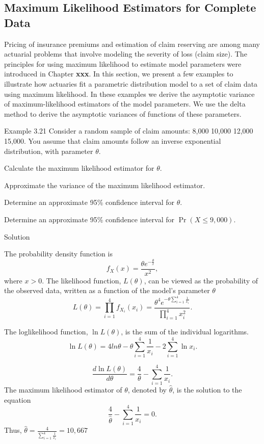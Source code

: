 \documentclass[]{book}
\theoremstyle{definition}
\theoremstyle{definition}
\theoremstyle{definition}
\theoremstyle{remark}
\begin{document}
\subsection{Maximum Likelihood Estimators for Complete
Data}\label{maximum-likelihood-estimators-for-complete-data}

Pricing of insurance premiums and estimation of claim reserving are
among many actuarial problems that involve modeling the severity of loss
(claim size). The principles for using maximum likelihood to estimate
model parameters were introduced in Chapter \textbf{xxx}. In this
section, we present a few examples to illustrate how actuaries fit a
parametric distribution model to a set of claim data using maximum
likelihood. In these examples we derive the asymptotic variance of
maximum-likelihood estimators of the model parameters. We use the delta
method to derive the asymptotic variances of functions of these
parameters.

Example 3.21 Consider a random sample of claim amounts: 8,000 10,000
12,000 15,000. You assume that claim amounts follow an inverse
exponential distribution, with parameter \(\theta\).

Calculate the maximum likelihood estimator for \(\theta\).

Approximate the variance of the maximum likelihood estimator.

Determine an approximate 95\% confidence interval for \(\theta\).

Determine an approximate 95\% confidence interval for
\(\Pr \left( X \leq 9,000 \right).\)

Solution

The probability density function is
\[f_{X}\left( x \right) = \frac{\theta e^{- \frac{\theta}{x}}}{x^{2}}, \]
where \(x > 0\). The likelihood function, \(L\left( \theta \right)\),
can be viewed as the probability of the observed data, written as a
function of the model's parameter \(\theta\)
\[L\left( \theta \right) = \prod_{i = 1}^{4}{f_{X_{i}}\left( x_{i} \right)} = \frac{\theta^{4}e^{- \theta\sum_{i = 1}^{4}\frac{1}{x_{i}}}}{\prod_{i = 1}^{4}x_{i}^{2}}.\]

The loglikelihood function, \(\ln L \left( \theta \right)\), is the sum
of the individual logarithms.
\[\ln L \left( \theta \right) = 4ln\theta - \theta\sum_{i = 1}^{4}\frac{1}{x_{i}} - 2\sum_{i = 1}^{4}\ln x_{i} .\]

\[\frac{d \ln L \left( \theta \right)}{d \theta} = \frac{4}{\theta} - \sum_{i = 1}^{4}\frac{1}{x_{i}}.\]
The maximum likelihood estimator of \(\theta\), denoted by
\(\hat{\theta}\), is the solution to the equation
\[\frac{4}{\hat{\theta}} - \sum_{i = 1}^{4}{\frac{1}{x_{i}} = 0}.\]
Thus,
\(\hat{\theta} = \frac{4}{\sum_{i = 1}^{4}\frac{1}{x_{i}}} = 10,667\)
\end{document}
